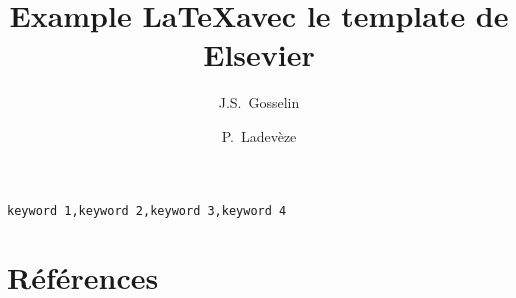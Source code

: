 


\begin{frontmatter} 

\title{Example \LaTeX avec le template de Elsevier}

\author[inrs]{J.S.~Gosselin}
\author[cgc]{P.~Ladevèze}

\address[inrs]{Institut national de la recherche scientifique, Centre Eau Terre Environnement, 490 rue de la Couronne, Quebec City, Quebec, Canada}
\address[cgc]{Geological Survey of Canada, Quebec Division, 490 rue de la Couronne, Quebec City, Quebec, Canada}

\begin{abstract}
    
\end{abstract}

\begin{keyword}
    \texttt{keyword 1\sep keyword 2\sep keyword 3\sep keyword 4}
\end{keyword}
  
\end{frontmatter}

\linenumbers








\section*{Références} 



